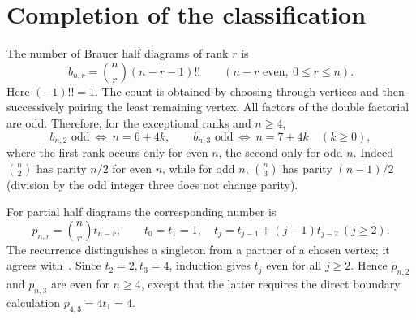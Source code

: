 \documentclass[11pt,a4paper]{article}
\begin{document}
\section{Completion of the classification}
The number of Brauer half diagrams of rank $r$ is
\begin{equation}\label{eq:counts}
 b_{n,r}=\binom nr(n-r-1)!!\qquad(n-r\text{ even},\ 0\le r\le n).
\end{equation}
Here $(-1)!!=1$. The count is obtained by choosing through vertices and then successively pairing the least remaining vertex. All factors of the double factorial are odd. Therefore, for the exceptional ranks and $n\ge4$,
\[
 b_{n,2}\text{ odd}\ \Longleftrightarrow\ n=6+4k,
 \qquad
 b_{n,3}\text{ odd}\ \Longleftrightarrow\ n=7+4k
 \quad(k\ge0),
\]
where the first rank occurs only for even $n$, the second only for odd $n$. Indeed $\binom n2$ has parity $n/2$ for even $n$, while for odd $n$, $\binom n3$ has parity $(n-1)/2$ (division by the odd integer three does not change parity).

For partial half diagrams the corresponding number is
\[
 p_{n,r}=\binom nr t_{n-r},\qquad
 t_0=t_1=1,\quad t_j=t_{j-1}+(j-1)t_{j-2}\ (j\ge2).
\]
The recurrence distinguishes a singleton from a partner of a chosen vertex; it agrees with~\cite[Proposition~2.7]{DEG}. Since $t_2=2,t_3=4$, induction gives $t_j$ even for all $j\ge2$. Hence $p_{n,2}$ and $p_{n,3}$ are even for $n\ge4$, except that the latter requires the direct boundary calculation $p_{4,3}=4t_1=4$.
\end{document}
